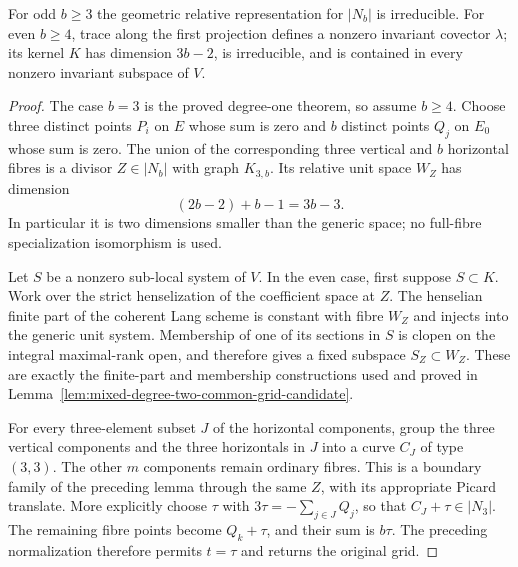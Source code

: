 \begin{lemma}
\label{lem:mixed-strip-grid-candidate}
For odd $b\ge3$ the geometric relative representation for
$|N_b|$ is irreducible. For even $b\ge4$, trace along the first
projection defines a nonzero invariant covector $\lambda$;
its kernel $K$ has dimension $3b-2$, is irreducible, and is
contained in every nonzero invariant subspace of $V$.
\end{lemma}
\begin{proof}
The case $b=3$ is the proved degree-one theorem, so assume $b\ge4$.
Choose three distinct points $P_i$ on $E$ whose sum is zero and
$b$ distinct points $Q_j$ on $E_0$ whose sum is zero. The union
of the corresponding three vertical and $b$ horizontal fibres
is a divisor $Z\in|N_b|$ with graph $K_{3,b}$. Its relative
unit space $W_Z$ has dimension
\[
            (2b-2)+b-1=3b-3.                            \tag{Strip-3}
\]
In particular it is two dimensions smaller than the generic
space; no full-fibre specialization isomorphism is used.

Let $S$ be a nonzero sub-local system of $V$. In the even case,
first suppose $S\subset K$. Work over the strict henselization
of the coefficient space at $Z$. The henselian finite part of
the coherent Lang scheme is constant with fibre $W_Z$ and
injects into the generic unit system. Membership of one of its
sections in $S$ is clopen on the integral maximal-rank open,
and therefore gives a fixed subspace $S_Z\subset W_Z$. These
are exactly the finite-part and membership constructions used
and proved in Lemma~\ref{lem:mixed-degree-two-common-grid-candidate}.

For every three-element subset $J$ of the horizontal components,
group the three vertical components and the three horizontals
in $J$ into a curve $C_J$ of type $(3,3)$. The other $m$
components remain ordinary fibres. This is a boundary family
of the preceding lemma through the same $Z$, with its appropriate
Picard translate. More explicitly choose $\tau$ with
$3\tau=-\sum_{j\in J}Q_j$, so that $C_J+\tau\in|N_3|$.
The remaining fibre points become $Q_k+\tau$, and their sum
is $b\tau$. The preceding normalization therefore permits
$t=\tau$ and returns the original grid.


\end{proof}
